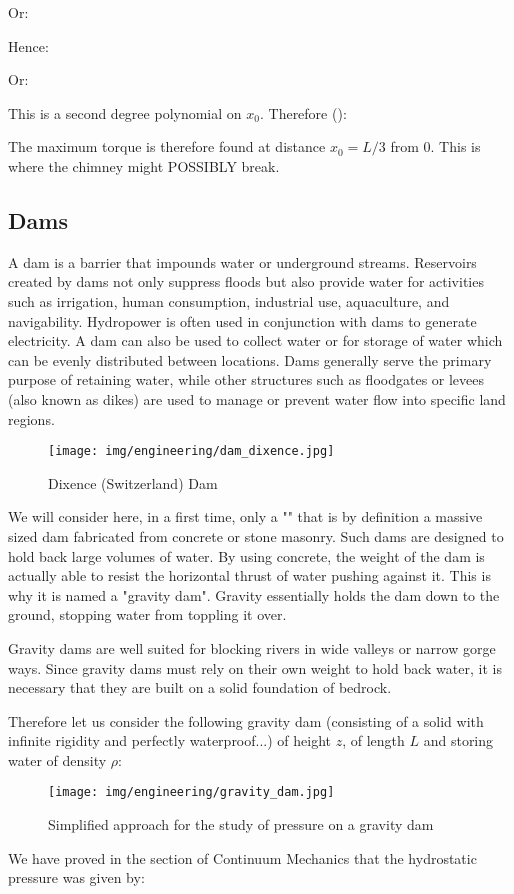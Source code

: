 	Or:
	
	Hence:
	
	Or:
	
	This is a second degree polynomial on $x_0$. Therefore ():
	
	
	The maximum torque is therefore found at distance $x_0 = L/3$
from $0$. This is where the chimney might POSSIBLY break.
	
	\pagebreak
	\subsection{Dams}
	A dam is a barrier that impounds water or underground streams. Reservoirs created by dams not only suppress floods but also provide water for activities such as irrigation, human consumption, industrial use, aquaculture, and navigability. Hydropower is often used in conjunction with dams to generate electricity. A dam can also be used to collect water or for storage of water which can be evenly distributed between locations. Dams generally serve the primary purpose of retaining water, while other structures such as floodgates or levees (also known as dikes) are used to manage or prevent water flow into specific land regions.
	\begin{figure}[H]
		\centering
		\texttt{[image: img/engineering/dam\_dixence.jpg]}
		\caption{Dixence (Switzerland) Dam}
	\end{figure}
	We will consider here, in a first time, only a "" that is by definition a massive sized dam fabricated from concrete or stone masonry. Such dams are designed to hold back large volumes of water. By using concrete, the weight of the dam is actually able to resist the horizontal thrust of water pushing against it. This is why it is named a "gravity dam". Gravity essentially holds the dam down to the ground, stopping water from toppling it over.

	Gravity dams are well suited for blocking rivers in wide valleys or narrow gorge ways. Since gravity dams must rely on their own weight to hold back water, it is necessary that they are built on a solid foundation of bedrock.
	
	Therefore let us consider the following gravity dam (consisting of a solid with infinite rigidity and perfectly waterproof...) of height $z$, of length $L$ and storing water of density $\rho$:	
	\begin{figure}[H]
		\centering
		\texttt{[image: img/engineering/gravity\_dam.jpg]}
		\caption[]{Simplified approach for the study of pressure on a gravity dam}
	\end{figure}
	We have proved in the section of Continuum Mechanics that the hydrostatic pressure was given by:
	
